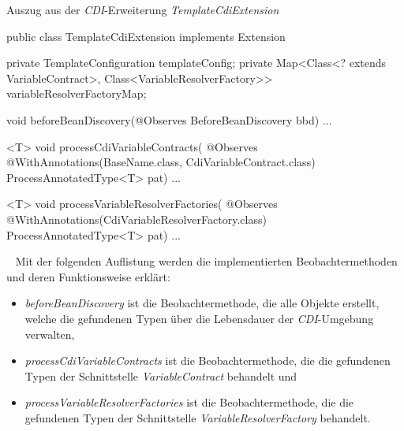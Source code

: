 \begin{program}
\caption{Auszug aus der \emph{CDI}-Erweiterung \emph{TemplateCdiExtension}}
\label{prog:templateCdiExtension}
\begin{JavaCode}
public class TemplateCdiExtension implements Extension {

    private TemplateConfiguration templateConfig;
    private Map<Class<? extends VariableContract>, 
                Class<VariableResolverFactory>>  
                      variableResolverFactoryMap;

    void beforeBeanDiscovery(@Observes BeforeBeanDiscovery bbd) { ... }

    <T> void processCdiVariableContracts(
              @Observes @WithAnnotations({BaseName.class, 
                                          CdiVariableContract.class})
              ProcessAnnotatedType<T> pat) { ... }

    <T> void processVariableResolverFactories(
         @Observes @WithAnnotations(CdiVariableResolverFactory.class)
         ProcessAnnotatedType<T> pat) { ... }
         
}
\end{JavaCode}
\end{program}
\ \newline
Mit der folgenden Auflistung werden die implementierten Beobachtermethoden und deren Funktionsweise erklärt:
\begin{itemize}
	\item\emph{beforeBeanDiscovery} ist die Beobachtermethode, die alle Objekte erstellt, welche die gefundenen Typen über die Lebensdauer der \emph{CDI}-Umgebung verwalten,
	\item\emph{processCdiVariableContracts} ist die Beobachtermethode, die die gefundenen Typen der Schnittstelle \emph{VariableContract} behandelt und
	\item\emph{processVariableResolverFactories} ist die Beobachtermethode, die die gefundenen Typen der Schnittstelle \emph{VariableResolverFactory} behandelt.
\end{itemize}

